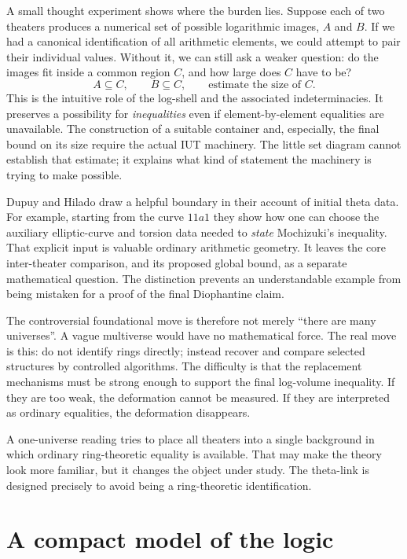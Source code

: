 A small thought experiment shows where the burden lies. Suppose each of two theaters produces a numerical set of possible logarithmic images, $A$ and $B$. If we had a canonical identification of all arithmetic elements, we could attempt to pair their individual values. Without it, we can still ask a weaker question: do the images fit inside a common region $C$, and how large does $C$ have to be?
\[
 A\subseteq C,\qquad B\subseteq C,
 \qquad \text{estimate the size of }C.
\]
This is the intuitive role of the log-shell and the associated indeterminacies. It preserves a possibility for \emph{inequalities} even if element-by-element equalities are unavailable. The construction of a suitable container and, especially, the final bound on its size require the actual IUT machinery. The little set diagram cannot establish that estimate; it explains what kind of statement the machinery is trying to make possible.

Dupuy and Hilado draw a helpful boundary in their account of initial theta data. For example, starting from the curve $11a1$ they show how one can choose the auxiliary elliptic-curve and torsion data needed to \emph{state} Mochizuki's inequality. That explicit input is valuable ordinary arithmetic geometry. It leaves the core inter-theater comparison, and its proposed global bound, as a separate mathematical question. The distinction prevents an understandable example from being mistaken for a proof of the final Diophantine claim.

The controversial foundational move is therefore not merely ``there are many universes''.  A vague multiverse would have no mathematical force.  The real move is this: do not identify rings directly; instead recover and compare selected structures by controlled algorithms.  The difficulty is that the replacement mechanisms must be strong enough to support the final log-volume inequality.  If they are too weak, the deformation cannot be measured.  If they are interpreted as ordinary equalities, the deformation disappears.

\begin{remark}
A one-universe reading tries to place all theaters into a single background in which ordinary ring-theoretic equality is available.  That may make the theory look more familiar, but it changes the object under study.  The theta-link is designed precisely to avoid being a ring-theoretic identification.
\end{remark}

\section{A compact model of the logic}


